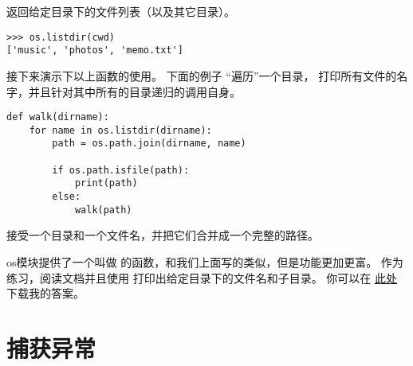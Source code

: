 {{{{{{{%

 返回给定目录下的文件列表（以及其它目录）。

\begin{lstlisting}
>>> os.listdir(cwd)
['music', 'photos', 'memo.txt']
\end{lstlisting}

%

接下来演示下以上函数的使用。 下面的例子 ``遍历''一个目录， 打印所有文件的名字，并且针对其中所有的目录递归的调用自身。

  

\begin{lstlisting}
def walk(dirname):
    for name in os.listdir(dirname):
        path = os.path.join(dirname, name)

        if os.path.isfile(path):
            print(path)
        else:
            walk(path)
\end{lstlisting}

%

 接受一个目录和一个文件名，并把它们合并成一个完整的路径。


os模块提供了一个叫做  的函数，和我们上面写的类似，但是功能更加更富。
作为练习，阅读文档并且使用  打印出给定目录下的文件名和子目录。
你可以在 \href{http://thinkpython2.com/code/walk.py}{此处} 下载我的答案。


\section{捕获异常}
\label{catch}

}}}}}}}
